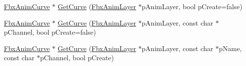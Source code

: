 \begin{DoxyCompactItemize}
\item 
\hyperlink{class_fbx_anim_curve}{Fbx\+Anim\+Curve} $\ast$ \hyperlink{class_fbx_property_a78b7ee36876a91b8689caae3117cbbb0}{Get\+Curve} (\hyperlink{class_fbx_anim_layer}{Fbx\+Anim\+Layer} $\ast$p\+Anim\+Layer, bool p\+Create=false)
\item 
\hyperlink{class_fbx_anim_curve}{Fbx\+Anim\+Curve} $\ast$ \hyperlink{class_fbx_property_aac649fc614b3174b351d36d6e67e5c90}{Get\+Curve} (\hyperlink{class_fbx_anim_layer}{Fbx\+Anim\+Layer} $\ast$p\+Anim\+Layer, const char $\ast$p\+Channel, bool p\+Create=false)
\item 
\hyperlink{class_fbx_anim_curve}{Fbx\+Anim\+Curve} $\ast$ \hyperlink{class_fbx_property_aa676a46d3dd168f9bdcac1b4161561ee}{Get\+Curve} (\hyperlink{class_fbx_anim_layer}{Fbx\+Anim\+Layer} $\ast$p\+Anim\+Layer, const char $\ast$p\+Name, const char $\ast$p\+Channel, bool p\+Create)
\end{DoxyCompactItemize}
